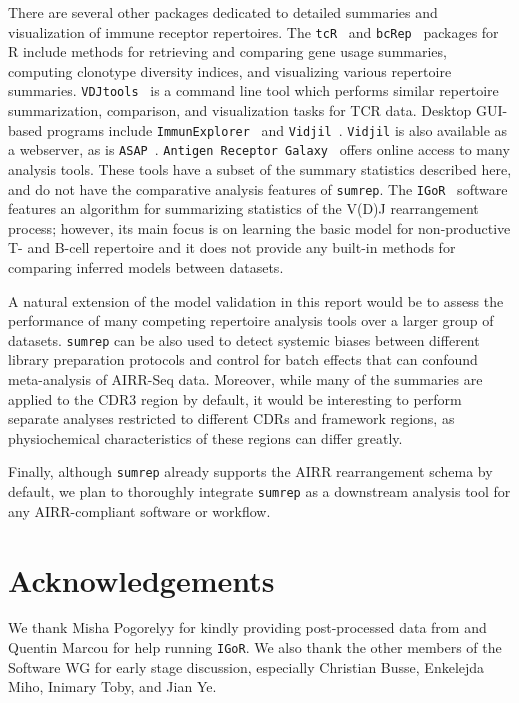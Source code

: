 \documentclass{article}
\newcommand{\igor}{\texttt{IGoR}}
\begin{document}
There are several other packages dedicated to detailed summaries and visualization of immune receptor repertoires.
The \texttt{tcR}~\cite{Nazarov2015-ok} and \texttt{bcRep}~\cite{Bischof2016-fn} packages for R include methods for retrieving and comparing gene usage summaries, computing clonotype diversity indices, and visualizing various repertoire summaries.
\texttt{VDJtools}~\cite{Shugay2015-ur} is a command line tool which performs similar repertoire summarization, comparison, and visualization tasks for TCR data.
Desktop GUI-based programs include \texttt{ImmunExplorer}~\cite{Schaller2015-sw} and \texttt{Vidjil}~\cite{Duez2016-dt}.
\texttt{Vidjil} is also available as a webserver, as is \texttt{ASAP}~\cite{Avram2018-aw}.
\texttt{Antigen Receptor Galaxy}~\cite{IJspeert2017-iv} offers online access to many analysis tools.
These tools have a subset of the summary statistics described here, and do not have the comparative analysis features of \texttt{sumrep}.
The \igor~\cite{Marcou2018-du} software features an algorithm for summarizing statistics of the V(D)J rearrangement process; however, its main focus is on learning the basic model for non-productive T- and B-cell repertoire and it does not provide any built-in methods for comparing inferred models between datasets.

A natural extension of the model validation in this report would be to assess the performance of many competing repertoire analysis tools over a larger group of datasets.
\texttt{sumrep} can be also used to detect systemic biases between different library preparation protocols and control for batch effects that can confound meta-analysis of AIRR-Seq data.
Moreover, while many of the summaries are applied to the CDR3 region by default, it would be interesting to perform separate analyses restricted to different CDRs and framework regions, as physiochemical characteristics of these regions can differ greatly.

Finally, although \texttt{sumrep} already supports the AIRR rearrangement schema by default, we plan to thoroughly integrate \texttt{sumrep} as a downstream analysis tool for any AIRR-compliant software or workflow.


\section*{Acknowledgements}
We thank Misha Pogorelyy for kindly providing post-processed data from \cite{Pogorelyy2018-ak} and Quentin Marcou for help running \igor.
We also thank the other members of the Software WG for early stage discussion, especially Christian Busse, Enkelejda Miho, Inimary Toby, and Jian Ye.
\end{document}

